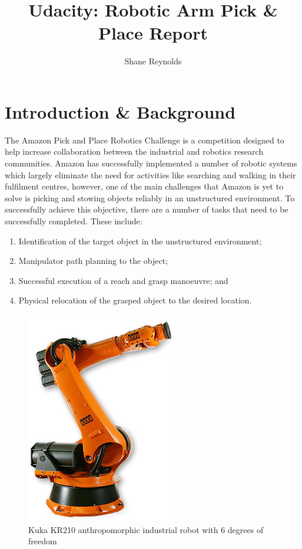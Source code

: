 \documentclass[a4paper]{article}
\begin{document}
\title{Udacity: Robotic Arm Pick \& Place Report}
\author{Shane Reynolds}
\maketitle

\tableofcontents

\newpage

\section{Introduction \& Background}
The Amazon Pick and Place Robotics Challenge is a competition designed to help increase collaboration between the industrial and robotics research communities. Amazon has successfully implemented a number of robotic systems which largely eliminate the need for activities like searching and walking in their fulfilment centres, however, one of the main challenges that Amazon is yet to solve is picking and stowing objects reliably in an unstructured environment. To successfully achieve this objective, there are a number of tasks that need to be successfully completed. These include:
\begin{enumerate}
\item Identification of the target object in the unstructured environment;
\item Manipulator path planning to the object;
\item Successful execution of a reach and grasp manoeuvre; and
\item Physical relocation of the grasped object to the desired location.
\end{enumerate}

\begin{figure}[h]
\centering
\includegraphics[scale=0.5]{image1}
\caption{Kuka KR210 anthropomorphic industrial robot with 6 degrees of freedom}
\end{figure}
\end{document}
